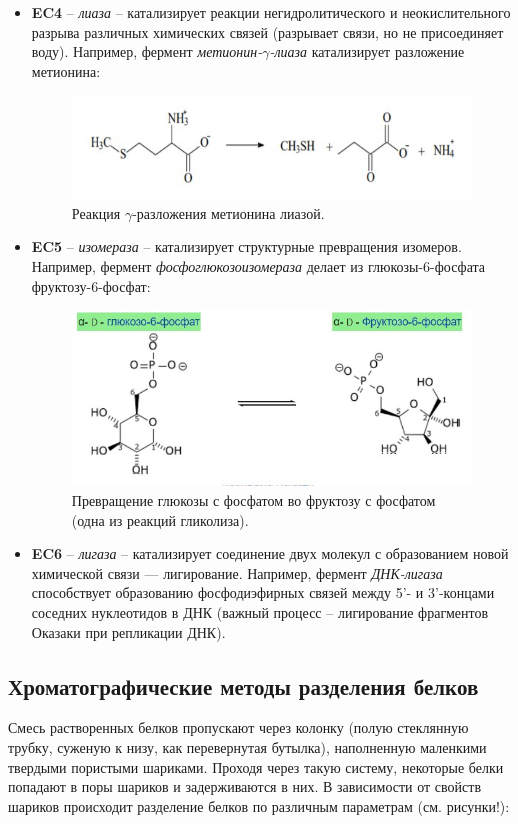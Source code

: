 \begin{itemize}
	\item \textbf{EC4} -- \textit{лиаза} -- катализирует реакции негидролитического и неокислительного разрыва различных химических связей (разрывает связи, но не присоединяет воду). Например, фермент \textit{метионин-$\gamma$-лиаза} катализирует разложение метионина:
		\begin{figure}[H]
		\centering
		\includegraphics[width=\linewidth]{Pictures/Lease.jpg}
		\caption{Реакция $\gamma$-разложения метионина лиазой.}
	\end{figure}

	\item \textbf{EC5} -- \textit{изомераза} -- катализирует структурные превращения изомеров. Например, фермент \textit{фосфоглюкозоизомераза} делает из глюкозы-6-фосфата фруктозу-6-фосфат:
	\begin{figure}[H]
		\centering
		\includegraphics[width=\linewidth]{Pictures/Izomerase.jpg}
		\caption{Превращение глюкозы с фосфатом во фруктозу с фосфатом (одна из реакций гликолиза).}
	\end{figure}

	\item \textbf{EC6} -- \textit{лигаза} -- катализирует соединение двух молекул с образованием новой химической связи — лигирование. Например, фермент \textit{ДНК-лигаза} способствует образованию фосфодиэфирных связей между 5'- и 3'-концами соседних нуклеотидов в ДНК (важный процесс -- лигирование фрагментов Оказаки при репликации ДНК).
\end{itemize}

\subsection{Хроматографические методы разделения белков}
Смесь растворенных белков пропускают через колонку (полую стеклянную трубку, суженую к низу, как перевернутая бутылка), наполненную маленкими твердыми пористыми шариками. Проходя через такую систему, некоторые белки попадают в поры шариков и задерживаются в них. В зависимости от свойств шариков происходит разделение белков по различным параметрам (см. рисунки!):

